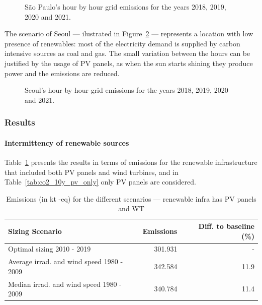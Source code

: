 \begin{figure}[H]
  \centering
  {}
  \caption{São Paulo's hour by hour grid emissions for the years 2018, 2019, 2020 and 2021.}
  \label{fig:co2_sp}
\end{figure}

The scenario of Seoul --- ilustrated in Figure~\ref{fig:co2_seoul} --- represents a location with low presence of renewables: most of the electricity demand is supplied by carbon intensive sources as coal and gas. The small variation between the hours can be justified by the usage of PV panels, as when the sun starts shining they produce power and the emissions are reduced.


\begin{figure}[H]
  \centering
  {}
  \caption{Seoul's hour by hour grid emissions for the years 2018, 2019, 2020 and 2021.}
  \label{fig:co2_seoul}
\end{figure}




\subsubsection{Results}

\paragraph{Intermittency of renewable sources}

Table~\ref{tab:co2_10y} presents the results in terms of  emissions for the renewable infrastructure that included both PV panels and wind turbines, and in Table~\ref{tab:co2_10y_pv_only} only PV panels are considered.


\begin{table}[H]
  \caption{Emissions (in kt -eq) for the different scenarios --- renewable infra has PV panels and WT} \centering
    \label{tab:co2_10y}
      \begin{tabular}{|l|r|r|}        
        \hline        
        \textbf{Sizing Scenario} &  \textbf{Emissions } & \textbf{Diff. to baseline (\%) } \\
        \hline        
        Optimal sizing 2010 - 2019  &       301.931 & - \\
        \hline     
        Average irrad. and wind speed  1980 - 2009  &      342.584 &  11.9 \\
        \hline
        Median irrad. and wind speed  1980 - 2009  &      340.784 &   11.4 \\
        \hline        
      \end{tabular}      
    \end{table}

